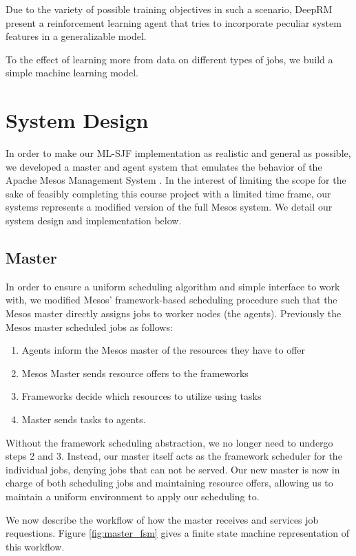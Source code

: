 \documentclass{hotnets19}
\begin{document}
Due to the variety of possible training objectives in such a scenario, DeepRM \cite{deeprl} present a reinforcement learning agent that tries to incorporate peculiar system features in a generalizable model.

To the effect of learning more from data on different types of jobs, we build a simple machine learning model.

\section{System Design}

In order to make our ML-SJF implementation as realistic and general as possible, we developed a master and agent system that emulates the behavior of the Apache Mesos Management System \cite{hindman2011mesos}. In the interest of limiting the scope for the sake of feasibly completing this course project with a limited time frame, our systems represents a modified version of the full Mesos system. We detail our system design and implementation below. 

\subsection{Master}
In order to ensure a uniform scheduling algorithm and simple interface to work with, we modified Mesos' framework-based scheduling procedure such that the Mesos master directly assigns jobs to worker nodes (the agents). 
Previously the Mesos master scheduled jobs as follows:
\begin{enumerate}
	\item Agents inform the Mesos master of the resources they have to offer
	\item Mesos Master sends resource offers to the frameworks
	\item Frameworks decide which resources to utilize using tasks
	\item Master sends tasks to agents.
\end{enumerate}
Without the framework scheduling abstraction, we no longer need to undergo steps 2 and 3. Instead, our master itself acts as the framework scheduler for the individual jobs, denying jobs that can not be served. Our new master is now in charge of both scheduling jobs and maintaining resource offers, allowing us to maintain a uniform environment to apply our scheduling to.

We now describe the workflow of how the master receives and services job requestions. Figure \ref{fig:master_fsm} gives a finite state machine representation of this workflow.
\end{document}
